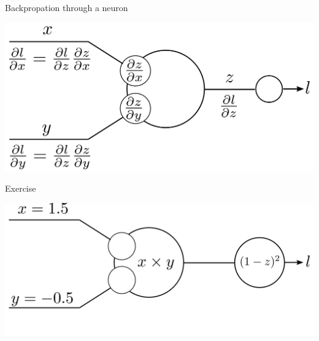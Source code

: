 \documentclass[xcolor=pdftex,dvipsnames,table,mathserif]{beamer}
\begin{document}
\begin{frame}

\end{frame}

\begin{frame}{Backpropation through a neuron}

  \includegraphics[width=\textwidth]{bp_2_1_neuron.png}

\end{frame}


\begin{frame}{Exercise}

  \includegraphics[width=\textwidth]{bp_2_1_neuron_exo.png}

\end{frame}
\end{document}
